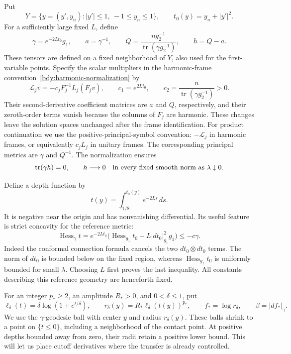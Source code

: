 Put
\[
 Y=\{y=(y',y_n):|y'|\le1,\ -1\le y_n\le1\},
 \qquad t_0(y)=y_n+|y'|^2.
\]
For a sufficiently large fixed $L$, define
\begin{equation}\label{sph:normalization}
 \gamma=e^{-2Lt_0}g_1,\qquad a=\gamma^{-1},\qquad
 Q=\frac{n g_2^{-1}}{\operatorname{tr}(\gamma g_2^{-1})},
 \qquad h=Q-a.
\end{equation}
These tensors are defined on a fixed neighborhood of $Y$, also used
for the first-variable points.  Specify the scalar multipliers in the
harmonic-frame convention~\eqref{bdy:harmonic-normalization} by
\begin{equation}\label{sph:frame-normalization}
 \mathcal L_jv=-c_jF_j^{-1}L_j(F_jv),\qquad
 c_1=e^{2Lt_0},\qquad
 c_2=\frac{n}{\operatorname{tr}(\gamma g_2^{-1})}>0.
\end{equation}
Their second-derivative coefficient matrices are $a$ and $Q$,
respectively, and their zeroth-order terms vanish because the columns
of $F_j$ are harmonic.  These changes leave the solution spaces
unchanged after the frame identification.  For product continuation
we use the positive-principal-symbol convention: $-\mathcal L_j$ in
harmonic frames, or equivalently $c_jL_j$ in unitary frames.  The
corresponding principal metrics are $\gamma$ and $Q^{-1}$.
The normalization ensures
\begin{equation}\label{sph:trace-free}
 \operatorname{tr}(\gamma h)=0,\qquad h\longrightarrow0
 \quad\hbox{in every fixed smooth norm as }\lambda\downarrow0.
\end{equation}

Define a depth function by
\begin{equation}\label{sph:depth}
 t(y)=\int_{1/8}^{t_0(y)}e^{-2Ls}\,ds.
\end{equation}
It is negative near the origin and has nonvanishing differential.
Its useful feature is strict concavity for the reference metric:
\begin{equation}\label{sph:depth-hessian}
 \operatorname{Hess}_{\gamma}t
 =e^{-2Lt_0}\bigl(
     \operatorname{Hess}_{g_1}t_0
       -L|dt_0|_{g_1}^2g_1\bigr)\le-c\gamma.
\end{equation}
Indeed the conformal connection formula cancels the two
$dt_0\otimes dt_0$ terms.  The norm of $dt_0$ is bounded below on the
fixed region, whereas $\operatorname{Hess}_{g_1}t_0$ is uniformly bounded
for small $\lambda$.  Choosing $L$ first proves the last inequality.
All constants describing this reference geometry are henceforth fixed.

For an integer $p_*\ge2$, an amplitude $R_*>0$, and $0<\delta\le1$, put
\begin{equation}\label{sph:radius}
 \ell_\delta(t)=\delta\log(1+e^{t/\delta}),\qquad
 r_\delta(y)=R_*\ell_\delta(t(y))^{p_*},\qquad
 f_*=\log r_\delta,\qquad \beta=|df_*|_\gamma.
\end{equation}
We use the $\gamma$-geodesic ball with center $y$ and radius
$r_\delta(y)$.  These balls shrink to a point on $\{t\le0\}$, including
a neighborhood of the contact point.  At positive depths bounded away
from zero, their radii retain a positive lower bound.  This will let us
place cutoff derivatives where the transfer is already controlled.


